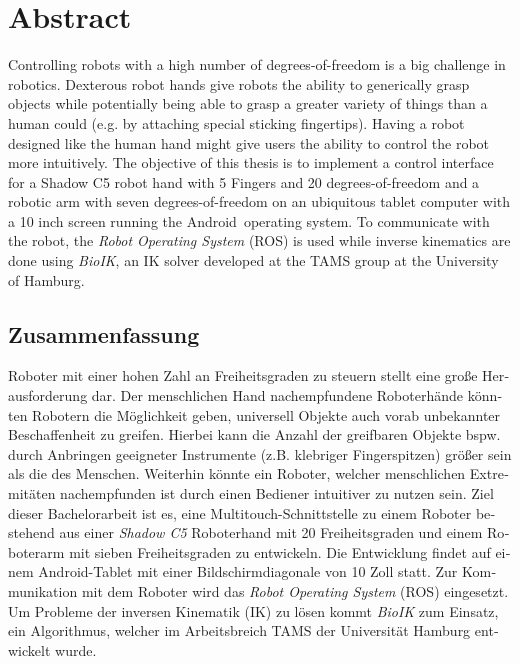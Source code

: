 \chapter{Abstract}

Controlling robots with a high number of degrees-of-freedom is a big challenge in robotics. Dexterous robot hands give robots the ability to generically grasp objects while potentially being able to grasp a greater variety of things than a human could (e.g. by attaching special sticking fingertips). Having a robot designed like the human hand might give users the ability to control the robot more intuitively. The objective of this thesis is to implement a control interface for a Shadow C5 robot hand with 5 Fingers and 20 degrees-of-freedom and a robotic arm with seven degrees-of-freedom on an ubiquitous tablet computer with a 10 inch screen running the Android\textregistered~operating system. To communicate with the robot, the \textit{Robot Operating System} (ROS) is used while inverse kinematics are done using \textit{BioIK}\cite{Ruppel17}, an IK solver developed at the TAMS group at the University of Hamburg.

\begin{otherlanguage}{ngerman}
{\let\clearpage\relax\chapter*{Zusammenfassung}}

Roboter mit einer hohen Zahl an Freiheitsgraden zu steuern stellt eine große Herausforderung dar. Der menschlichen Hand nachempfundene Roboterhände könnten Robotern die Möglichkeit geben, universell Objekte auch vorab unbekannter Beschaffenheit zu greifen. Hierbei kann die Anzahl der greifbaren Objekte bspw. durch Anbringen geeigneter Instrumente (z.B. klebriger Fingerspitzen) größer sein als die des Menschen. Weiterhin könnte ein Roboter, welcher menschlichen Extremitäten nachempfunden ist durch einen Bediener intuitiver zu nutzen sein. Ziel dieser Bachelorarbeit ist es, eine Multitouch-Schnittstelle zu einem Roboter bestehend aus einer \textit{Shadow C5} Roboterhand mit 20 Freiheitsgraden und einem Roboterarm mit sieben Freiheitsgraden zu entwickeln. Die Entwicklung findet auf einem Android\textregistered-Tablet mit einer Bildschirmdiagonale von 10 Zoll statt. Zur Kommunikation mit dem Roboter wird das \textit{Robot Operating System} (ROS) eingesetzt. Um Probleme der inversen Kinematik (IK) zu lösen kommt \textit{BioIK}\cite{Ruppel17} zum Einsatz, ein Algorithmus, welcher im Arbeitsbreich TAMS der Universität Hamburg entwickelt wurde.

\end{otherlanguage}

